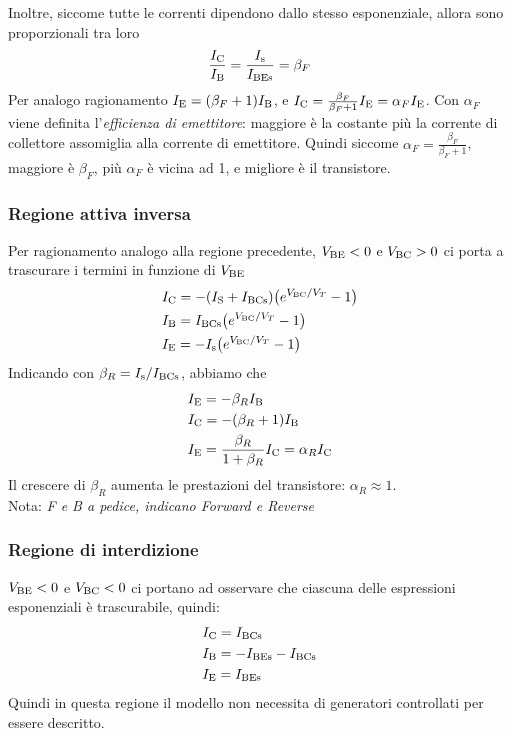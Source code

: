 \documentclass[../elettronica]{subfiles}
\begin{document}
Inoltre, siccome tutte le correnti dipendono dallo stesso esponenziale, allora sono proporzionali tra loro
\[
    \frac{\I{C}}{\I{B}} = \frac{\I{s}}{\I{BEs}} = \beta_F
\]
Per analogo ragionamento $\I{E} = (\beta_F+1) \I{B}$, e $\I{C} = \frac{\beta_F}{\beta_F + 1}\I{E} = \alpha_F \I{E}$.
Con $\alpha_F$ viene definita l'\textit{efficienza di emettitore}: maggiore è la costante più la corrente di collettore assomiglia alla corrente di emettitore.
Quindi siccome $\alpha_F = \frac{\beta_F}{\beta_F + 1}$, maggiore è $\beta_F$, più $\alpha_F$ è vicina ad 1, e migliore è il transistore.

\subsubsection{Regione attiva inversa}
Per ragionamento analogo alla regione precedente, $\V{BE} < 0$ e $\V{BC} > 0$ ci porta a trascurare i termini in funzione di $\V{BE}$
\begin{align*}
    &\I{C} = -\diodecurrent[(\I{S} + \I{BCs})]{\V{BC}}\\
    &\I{B} = \diodecurrent[\I{BCs}]{\V{BC}}\\
    &\I{E} = -\diodecurrent[\I{s}]{\V{BC}}\\
\end{align*}
Indicando con $\beta_R = {\I{s}}/{\I{BCs}}$, abbiamo che
\begin{align*}
    &\I{E} = - \beta_R \I{B}\\
    &\I{C} = -(\beta_R + 1) \I{B}\\
    &\I{E} = \frac{\beta_R}{1 + \beta_R}\I{C} = \alpha_R \I{C}
\end{align*}
Il crescere di $\beta_R$ aumenta le prestazioni del transistore: $\alpha_R \approx 1$.
\\[1em]
Nota: \textit{F e B a pedice, indicano Forward e Reverse}

\subsubsection{Regione di interdizione}
$\V{BE} < 0$ e $\V{BC} < 0$ ci portano ad osservare che ciascuna delle espressioni esponenziali è trascurabile, quindi:
\begin{align*}
    &\I{C} = \I{BCs}\\
    &\I{B} = - \I{BEs} - \I{BCs}\\
    &\I{E} = \I{BEs}
\end{align*}
Quindi in questa regione il modello non necessita di generatori controllati per essere descritto.
\end{document}
